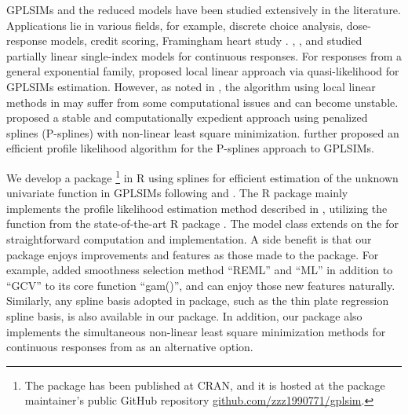 GPLSIMs and the reduced models have been studied extensively in the literature. Applications lie in various fields, for example, discrete choice analysis, dose-response models, credit scoring, Framingham heart study \citep[][and references therein]{yu_penalised_2017}.  
\cite{yu_penalized_2002}, \cite{xia_semi-parametric_2006}, and \cite{liang_estimation_2010} studied partially linear single-index models for continuous responses. For responses from a general exponential family, \cite{carroll_generalized_1997} proposed local linear approach via quasi-likelihood for GPLSIMs estimation. 
However, as noted in \cite{yu_penalized_2002}, the algorithm using local linear methods in \cite{carroll_generalized_1997} may suffer from some computational issues and can become unstable. \cite{yu_penalized_2002} proposed a stable and computationally expedient approach using penalized splines (P-splines) with non-linear least square minimization. \cite{yu_penalised_2017} further proposed an efficient profile likelihood algorithm for the P-splines approach to GPLSIMs. 

We develop a package \footnote{The package has been published at CRAN, and it is hosted at the package maintainer's public GitHub repository \url{github.com/zzz1990771/gplsim}.} in R \citep{R2021} using splines for efficient estimation of the unknown univariate function in GPLSIMs following \cite{yu_penalized_2002} and \cite{yu_penalised_2017}. The  R package mainly implements the profile likelihood estimation method described in \cite{yu_penalised_2017}, utilizing the function  \citep{Wood_fast_2011} from the state-of-the-art R package  \citep{wood_mgcv_2001}. The model class  extends on the  for straightforward computation and implementation. A side benefit is that our  package enjoys improvements and features as those made to the  package. For example,  added smoothness selection method ``REML'' and ``ML'' in addition to ``GCV'' to its core function ``gam()'', and  can enjoy those new features naturally. Similarly, any spline basis adopted in  package, such as the thin plate regression spline basis, is also available in our  package. In addition, our  package also implements the simultaneous non-linear least square minimization methods for continuous responses from \cite{yu_penalized_2002} as an alternative option. 


